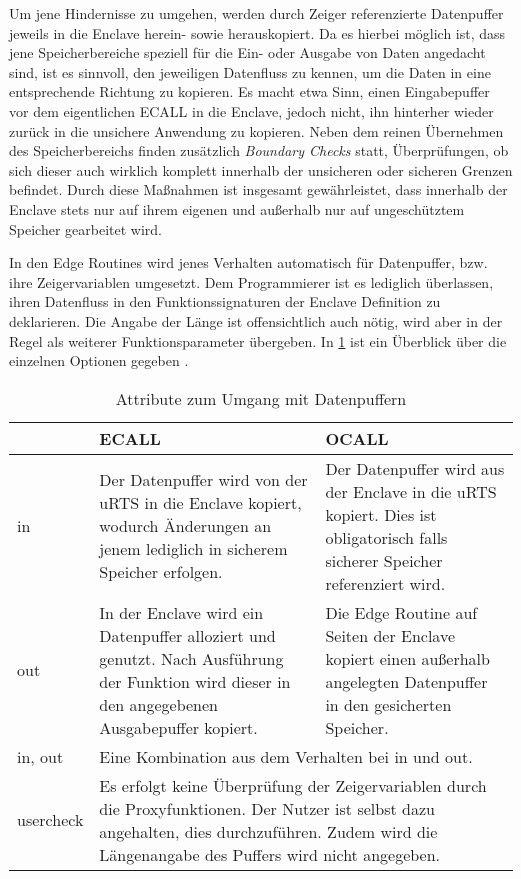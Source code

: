 Um jene Hindernisse zu umgehen, werden durch Zeiger referenzierte Datenpuffer jeweils in die Enclave herein- sowie herauskopiert. Da es hierbei möglich ist, dass jene Speicherbereiche speziell für die Ein- oder Ausgabe von Daten angedacht sind, ist es sinnvoll, den jeweiligen Datenfluss zu kennen, um die Daten in eine entsprechende Richtung zu kopieren. Es macht etwa Sinn, einen Eingabepuffer vor dem eigentlichen ECALL in die Enclave, jedoch nicht, ihn hinterher wieder zurück in die unsichere Anwendung zu kopieren. Neben dem reinen Übernehmen des Speicherbereichs finden zusätzlich \textit{Boundary Checks} statt, Überprüfungen, ob sich dieser auch wirklich komplett innerhalb der unsicheren oder sicheren Grenzen befindet. Durch diese Maßnahmen ist insgesamt gewährleistet, dass innerhalb der Enclave stets nur auf ihrem eigenen und außerhalb nur auf ungeschütztem Speicher gearbeitet wird.

In den Edge Routines wird jenes Verhalten automatisch für Datenpuffer, bzw. ihre Zeigervariablen umgesetzt. Dem Programmierer ist es lediglich überlassen, ihren Datenfluss in den Funktionssignaturen der Enclave Definition zu deklarieren. Die Angabe der Länge ist offensichtlich auch nötig, wird aber in der Regel als weiterer Funktionsparameter übergeben. In \ref{tab:sgxbuffer} ist ein Überblick über die einzelnen Optionen gegeben \cite{LinuxGuide}.

\begin{table}[h]
	\centering
	\begin{tabularx}{\textwidth}{|l|X|X|}
		\hline
		& \textbf{ECALL} & \textbf{OCALL} \\
		\hline
		in & Der Datenpuffer wird von der uRTS in die Enclave kopiert, wodurch Änderungen an jenem lediglich in sicherem Speicher erfolgen. & Der Datenpuffer wird aus der Enclave in die uRTS kopiert. Dies ist obligatorisch falls sicherer Speicher referenziert wird. \\
		\hline
		out & In der Enclave wird ein Datenpuffer alloziert und genutzt. Nach Ausführung der Funktion wird dieser in den angegebenen Ausgabepuffer kopiert. & Die Edge Routine auf Seiten der Enclave kopiert einen außerhalb angelegten Datenpuffer in den gesicherten Speicher. \\
		\hline
		in, out & \multicolumn{2}{l|}{Eine Kombination aus dem Verhalten bei in und out.} \\
		\hline
		user\textunderscore check & \multicolumn{2}{p{0.8\textwidth}|}{Es erfolgt keine Überprüfung der Zeigervariablen durch die Proxyfunktionen. Der Nutzer ist selbst dazu angehalten, dies durchzuführen. Zudem wird die Längenangabe des Puffers wird nicht angegeben.} \\
		\hline
	\end{tabularx}
	\caption{Attribute zum Umgang mit Datenpuffern}
	\label{tab:sgxbuffer}
\end{table}

